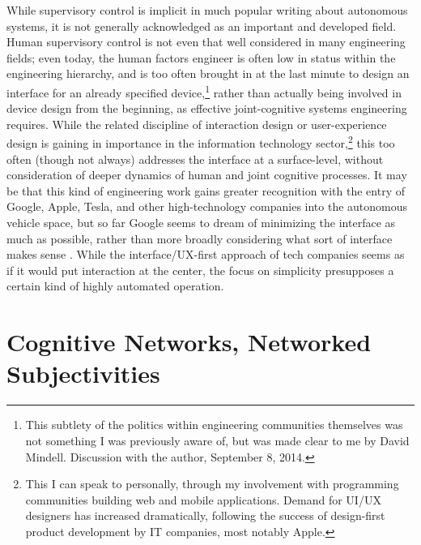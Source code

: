  While supervisory control is
implicit in much popular writing about autonomous systems,
it is not generally acknowledged as an important and
developed field. Human supervisory control is not even that well
considered in many engineering fields; even today, the human factors
engineer is often low in status within the engineering hierarchy, and
is too often brought in at the last minute to design an interface for
an already specified device,\footnote{This subtlety of the politics
  within engineering communities themselves was not something I was
  previously aware of, but was made clear to me by David Mindell.
  Discussion with the author, September 8, 2014.} rather than actually
being involved in 
device design from the beginning, as effective joint-cognitive systems
engineering
requires. While the related discipline of interaction design or
user-experience design is gaining in importance in the information
technology sector,\footnote{This I can speak to personally, through my
  involvement with programming communities building web and mobile
  applications. Demand for UI/UX designers has increased dramatically,
following the success of design-first product development by IT
companies, most notably Apple.} this too often (though not always)
addresses the interface at a surface-level, without consideration of deeper
dynamics of human and joint cognitive processes. It may be
that this kind of engineering work gains greater recognition with the
entry of Google, Apple, Tesla, and other high-technology companies
into the autonomous vehicle space, but so far Google seems to dream
of minimizing the interface as much as possible, rather than more
broadly considering what sort of interface makes sense \cite{markoffNext}.
While the interface/UX-first approach of tech companies seems as if it
would put interaction at the center, the focus on simplicity
presupposes a certain kind of highly automated operation.

\section{Cognitive Networks, Networked Subjectivities}

